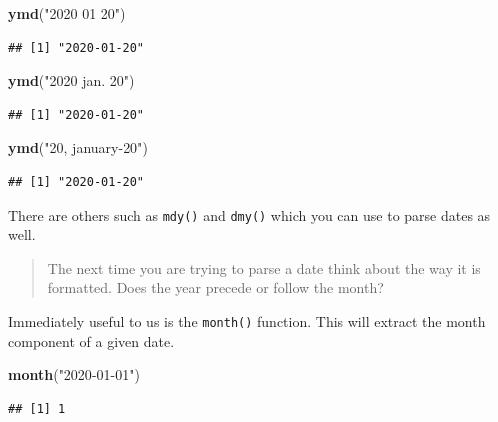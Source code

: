 \documentclass[
]{book}
\newenvironment{Shaded}{\begin{snugshade}}{\end{snugshade}}
\newcommand{\KeywordTok}[1]{\textcolor[rgb]{0.13,0.29,0.53}{\textbf{#1}}}
\newcommand{\NormalTok}[1]{#1}
\newcommand{\StringTok}[1]{\textcolor[rgb]{0.31,0.60,0.02}{#1}}
\begin{document}
\begin{Shaded}
\begin{Highlighting}[]
\KeywordTok{ymd}\NormalTok{(}\StringTok{"2020 01 20"}\NormalTok{)}
\end{Highlighting}
\end{Shaded}

\begin{verbatim}
## [1] "2020-01-20"
\end{verbatim}

\begin{Shaded}
\begin{Highlighting}[]
\KeywordTok{ymd}\NormalTok{(}\StringTok{"2020 jan. 20"}\NormalTok{)}
\end{Highlighting}
\end{Shaded}

\begin{verbatim}
## [1] "2020-01-20"
\end{verbatim}

\begin{Shaded}
\begin{Highlighting}[]
\KeywordTok{ymd}\NormalTok{(}\StringTok{"20, january{-}20"}\NormalTok{)}
\end{Highlighting}
\end{Shaded}

\begin{verbatim}
## [1] "2020-01-20"
\end{verbatim}

There are others such as \texttt{mdy()} and \texttt{dmy()} which you can use to parse dates as well.

\begin{quote}
The next time you are trying to parse a date think about the way it is formatted. Does the year precede or follow the month?
\end{quote}

Immediately useful to us is the \texttt{month()} function. This will extract the month component of a given date.

\begin{Shaded}
\begin{Highlighting}[]
\KeywordTok{month}\NormalTok{(}\StringTok{"2020{-}01{-}01"}\NormalTok{)}
\end{Highlighting}
\end{Shaded}

\begin{verbatim}
## [1] 1
\end{verbatim}
\end{document}
